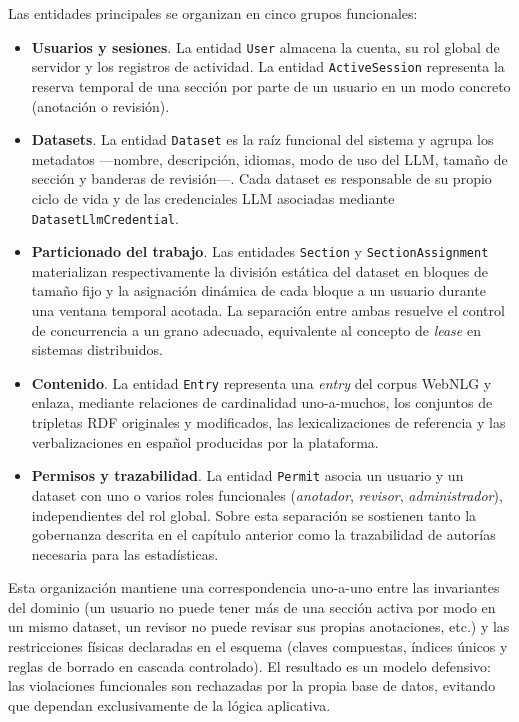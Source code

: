 Las entidades principales se organizan en cinco grupos funcionales:

\begin{itemize}
	\item \textbf{Usuarios y sesiones}. La entidad \texttt{User} almacena la cuenta, su
	      rol global de servidor y los registros de actividad. La entidad
	      \texttt{ActiveSession} representa la reserva temporal de una sección por parte
	      de un usuario en un modo concreto (anotación o revisión).
	\item \textbf{Datasets}. La entidad \texttt{Dataset} es la raíz funcional del sistema
	      y agrupa los metadatos ---nombre, descripción, idiomas, modo de uso del LLM,
	      tamaño de sección y banderas de revisión---. Cada dataset es responsable de su
	      propio ciclo de vida y de las credenciales LLM asociadas mediante
	      \texttt{Dataset\-Llm\-Credential}.
	\item \textbf{Particionado del trabajo}. Las entidades \texttt{Section} y
	      \texttt{Section\-Assignment} materializan respectivamente la división estática
	      del dataset en bloques de tamaño fijo y la asignación dinámica de cada bloque a
	      un usuario durante una ventana temporal acotada. La separación entre ambas
	      resuelve el control de concurrencia a un grano adecuado, equivalente al
	      concepto de \textit{lease} en sistemas distribuidos.
	\item \textbf{Contenido}. La entidad \texttt{Entry} representa una \textit{entry} del
	      corpus WebNLG y enlaza, mediante relaciones de cardinalidad uno-a-muchos, los
	      conjuntos de tripletas RDF originales y modificados, las lexicalizaciones de
	      referencia y las verbalizaciones en español producidas por la plataforma.
	\item \textbf{Permisos y trazabilidad}. La entidad \texttt{Permit} asocia un usuario
	      y un dataset con uno o varios roles funcionales (\textit{anotador},
	      \textit{revisor}, \textit{administrador}), independientes del rol global. Sobre
	      esta separación se sostienen tanto la gobernanza descrita en el capítulo
	      anterior como la trazabilidad de autorías necesaria para las estadísticas.
\end{itemize}

Esta organización mantiene una correspondencia uno-a-uno entre las invariantes
del dominio (un usuario no puede tener más de una sección activa por modo en un
mismo dataset, un revisor no puede revisar sus propias anotaciones, etc.) y las
restricciones físicas declaradas en el esquema (claves compuestas, índices
únicos y reglas de borrado en cascada controlado). El resultado es un modelo
defensivo: las violaciones funcionales son rechazadas por la propia base de
datos, evitando que dependan exclusivamente de la lógica aplicativa.

